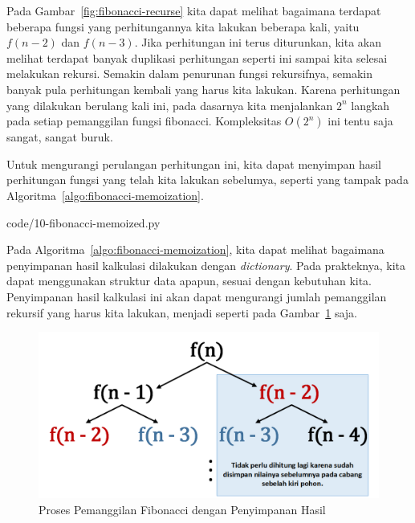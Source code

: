 Pada Gambar~\ref{fig:fibonacci-recurse} kita dapat melihat bagaimana terdapat beberapa fungsi yang perhitungannya kita lakukan beberapa kali, yaitu $f(n - 2)$ dan $f(n - 3)$. Jika perhitungan ini terus diturunkan, kita akan melihat terdapat banyak duplikasi perhitungan seperti ini sampai kita selesai melakukan rekursi. Semakin dalam penurunan fungsi rekursifnya, semakin banyak pula perhitungan kembali yang harus kita lakukan. Karena perhitungan yang dilakukan berulang kali ini, pada dasarnya kita menjalankan $2^n$ langkah pada setiap pemanggilan fungsi fibonacci. Kompleksitas $O(2^n)$ ini tentu saja sangat, sangat buruk.


Untuk mengurangi perulangan perhitungan ini, kita dapat menyimpan hasil perhitungan fungsi yang telah kita lakukan sebelumya, seperti yang tampak pada Algoritma~\ref{algo:fibonacci-memoization}.


                {code/10-fibonacci-memoized.py}

Pada Algoritma~\ref{algo:fibonacci-memoization}, kita dapat melihat bagaimana penyimpanan hasil kalkulasi dilakukan dengan \textit{dictionary}. Pada prakteknya, kita dapat menggunakan struktur data apapun, sesuai dengan kebutuhan kita. Penyimpanan hasil kalkulasi ini akan dapat mengurangi jumlah pemanggilan rekursif yang harus kita lakukan, menjadi seperti pada Gambar~\ref{fig:fibonacci-memoization} saja.

\begin{figure}
    \includegraphics[width=\textwidth,keepaspectratio]{fig/FibonacciDPCallStack.png}%
	\caption{Proses Pemanggilan Fibonacci dengan Penyimpanan Hasil}%
	\label{fig:fibonacci-memoization}%
\end{figure}

